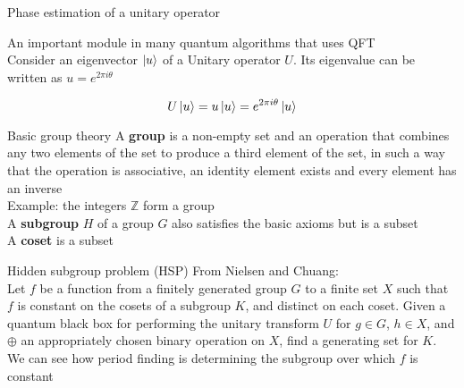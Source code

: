\documentclass[aspectratio=1610]{beamer}					%
\begin{document}
\begin{frame}{Phase estimation of a unitary operator}

An important module in many quantum algorithms that uses QFT\\
\vspace{0.1in}
Consider an eigenvector $\ket{u}$ of a Unitary operator $U$. Its eigenvalue can be written as $u = e^{2\pi i\theta}$

\begin{equation*}
U\ket{u} = u\ket{u} = e^{2\pi i\theta}\ket{u}
\end{equation*}

\end{frame}

\begin{frame}{Basic group theory}
A \textbf{group} is a non-empty set and an operation that combines any two elements of the set to produce a third element of the set, in such a way that the operation is associative, an identity element exists and every element has an inverse\\
Example: the integers $\mathbb{Z}$ form a group\\
\vspace{0.2in}
A \textbf{subgroup} $H$ of a group $G$ also satisfies the basic axioms but is a subset\\
\vspace{0.2in}
A \textbf{coset} is a subset 
\end{frame}

\begin{frame}{Hidden subgroup problem (HSP)}
From Nielsen and Chuang: \\
\vspace{0.2in}
Let $f$ be a function from a finitely generated group $G$ to a finite set $X$ such that
$f$ is constant on the cosets of a subgroup $K$, and distinct on each coset. Given a
quantum black box for performing the unitary transform $U$ for $g \in G$, $h \in X$, and $\oplus$ an appropriately chosen binary operation on $X$, find a generating set for $K$.\\
\vspace{0.2in}
We can see how period finding is determining the subgroup over which $f$ is constant
\end{frame}
\end{document}
